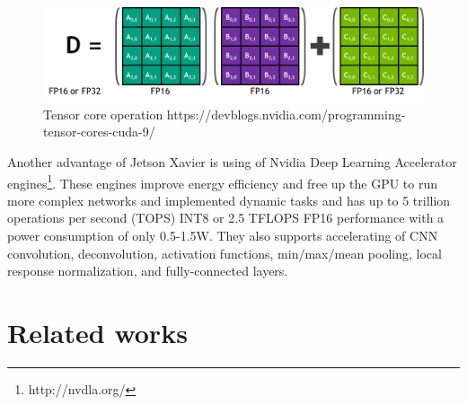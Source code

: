 \documentclass[twoside]{ctuthesis}
\theoremstyle{plain}
\theoremstyle{definition}
\theoremstyle{note}
\begin{document}
\begin{figure}[h]
\caption{Tensor core operation https://devblogs.nvidia.com/programming-tensor-cores-cuda-9/}
\label{tensor_core}
\includegraphics[width=\textwidth]{images/introduction/tensor_core.png}
\end{figure}
Another advantage of Jetson Xavier is using of Nvidia Deep Learning Accelerator engines\footnote{http://nvdla.org/}. These engines improve energy efficiency and free up the GPU to run more complex networks and implemented dynamic tasks  and has up to 5 trillion operations per second (TOPS) INT8 or 2.5 TFLOPS FP16 performance with a power consumption of only 0.5-1.5W. They also supports accelerating of CNN convolution, deconvolution, activation functions, min/max/mean pooling, local response normalization, and fully-connected layers.
\chapter{Related works}
\end{document}
